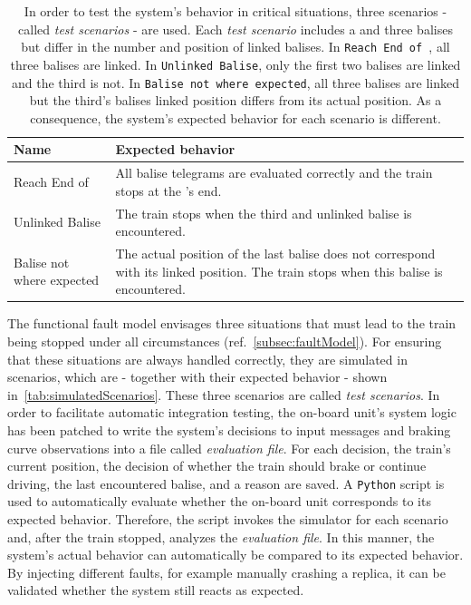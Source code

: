 \begin{table}[h!]
	\begin{center}
		\caption{In order to test the system's behavior in critical situations, three scenarios - called \textit{test scenarios} - are used. Each \textit{test scenario} includes a  and three balises but differ in the number and position of linked balises. In \texttt{Reach End of }, all three balises are linked. In \texttt{Unlinked Balise}, only the first two balises are linked and the third is not. In \texttt{Balise not where expected}, all three balises are linked but the third's balises linked position differs from its actual position. As a consequence, the system's expected behavior for each scenario is different.}
		\label{tab:simulatedScenarios}
		\begin{tabularx}{\textwidth}{|X|X|}
			\hline
			\textbf{Name} & \textbf{Expected behavior}\\
			\hline \hline
			Reach End of \abr{MA} & All balise telegrams are evaluated correctly and the train stops at the \abr{MA}'s end. \\
			\hline
			Unlinked Balise & The train stops when the third and unlinked balise is encountered. \\
			\hline
			Balise not where expected & The actual position of the last balise does not correspond with its linked position. The train stops when this balise is encountered. \\
			\hline
		\end{tabularx}
	\end{center}
\end{table}


The functional fault model envisages three situations that must lead to the train being stopped under all circumstances (ref.~\autoref{subsec:faultModel}).
For ensuring that these situations are always handled correctly, they are simulated in scenarios, which are - together with their expected behavior - shown in~\autoref{tab:simulatedScenarios}.
These three scenarios are called \textit{test scenarios}.
In order to facilitate automatic integration testing, the on-board unit's system logic has been patched to write the system's decisions to input messages and braking curve observations into a file called \textit{evaluation file}.
For each decision, the train's current position, the decision of whether the train should brake or continue driving, the last encountered balise, and a reason are saved.
A \texttt{Python} script is used to automatically evaluate whether the on-board unit corresponds to its expected behavior.
Therefore, the script invokes the simulator for each scenario and, after the train stopped, analyzes the \textit{evaluation file}.
In this manner, the system's actual behavior can automatically be compared to its expected behavior.
By injecting different faults, for example manually crashing a replica, it can be validated whether the system still reacts as expected.


